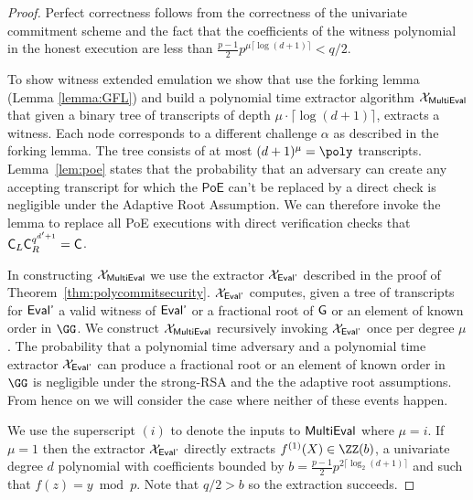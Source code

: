 \begin{proof}
	Perfect correctness follows from the correctness of the univariate commitment scheme and the fact that the coefficients of the witness polynomial in the honest execution are less than $\frac{p-1}{2}p^{\mu \lceil\log(d+1)\rceil}<q/2$.
	
	To show witness extended emulation we show that 
	use the forking lemma (Lemma \ref{lemma:GFL}) and build a polynomial time extractor algorithm $\mathcal{X}_{\textsf{{MultiEval}}}$ that given a binary tree of transcripts of depth $\mu \cdot\lceil\log(d+1)\rceil$, extracts a witness. Each node corresponds to a different challenge $\alpha$ as described in the forking lemma. The tree consists of at most $(d+1)^{\mu}=\poly$ transcripts. 
	Lemma~\ref{lem:poe} states that the probability that an adversary can create any accepting transcript for which the $\textsf{PoE}$ can't be replaced by a direct check is negligible under the Adaptive Root Assumption.
We can therefore invoke the lemma to replace all \textsf{PoE} executions with direct verification checks that $\gr{C}_L\gr{C}_R^{q^{d'+1}}=\gr{C}$. 

In constructing $\mathcal{X}_{\textsf{{MultiEval}}}$ we use the extractor $\mathcal{X}_{\textsf{{Eval'}}}$ described in the proof of Theorem~\ref{thm:polycommitsecurity}. $\mathcal{X}_{\textsf{{Eval'}}}$ computes, given a tree of transcripts for $\textsf{{Eval'}}$ a valid witness of $\textsf{{Eval'}}$ or a fractional root of $\gr{g}$ or an element of known order in $\GG$. We construct $\mathcal{X}_{\textsf{{MultiEval}}}$ recursively invoking $\mathcal{X}_{\textsf{{Eval'}}}$ once per degree $\mu$. The probability that a polynomial time adversary and a polynomial time extractor $\mathcal{X}_{\textsf{{Eval'}}}$ can produce a fractional root or an element of known order in $\GG$ is negligible under the strong-RSA and the the adaptive root assumptions. From hence on we will consider the case where neither of these events happen.

We use the superscript $(i)$ to denote the inputs to $\textsf{{MultiEval}}$ where $\mu=i$. 
If $\mu=1$ then the extractor $\mathcal{X}_{\textsf{{Eval'}}}$ directly extracts $f^{(1)}(X)\in \ZZ(b)$, a univariate degree $d$ polynomial with coefficients bounded by $b=\frac{p-1}{2}p^{2 \lceil\log_2(d+1)\rceil}$ and such that $f(z)=y \bmod p$. Note that $q/2>b$ so the extraction succeeds.


\end{proof}
